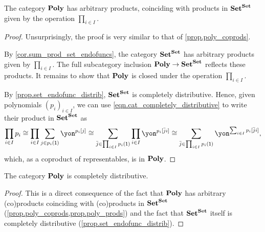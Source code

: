 \documentclass[Book-Poly]{subfiles}
\begin{document}
\begin{proposition}\label{prop.poly_prods}
  The category $\mathbf{Poly}$ has arbitrary products, coinciding with products in $\mathbf{Set}^{\mathbf{Set}}$ given by the operation $\prod_{i \in I}$.
\end{proposition}
\begin{proof}
  Unsurprisingly, the proof is very similar to that of \cref{prop.poly_coprods}.

  By \cref{cor.sum_prod_set_endofuncs}, the category $\mathbf{Set}^{\mathbf{Set}}$ has arbitrary products given by $\prod_{i \in I}$.
  The full subcategory inclusion $\mathbf{Poly} \to \mathbf{Set}^{\mathbf{Set}}$ reflects these products.
  It remains to show that $\mathbf{Poly}$ is closed under the operation $\prod_{i \in I}$.

  By \cref{prop.set_endofunc_distrib}, $\mathbf{Set}^{\mathbf{Set}}$ is completely distributive.
  Hence, given polynomials $(p_i)_{i \in I}$, we can use \eqref{eqn.cat_completely_distributive} to write their product in $\mathbf{Set}^{\mathbf{Set}}$ as
  \begin{equation} \label{eqn.poly_prod}
    \prod_{i \in I} p_i \iso \prod_{i \in I} \sum_{j \in p_i(\1)} \yon^{p_i[j]} \iso \sum_{\bar{j} \in \prod_{i \in I} p_i(\1)} \prod_{i \in I} \yon^{p_i[\bar{j}i]} \iso \sum_{\bar{j} \in \prod_{i \in I} p_i(\1)} \yon^{\sum_{i \in I} p_i[\bar{j}i]},
  \end{equation}
  which, as a coproduct of representables, is in $\mathbf{Poly}$.
\end{proof}


\begin{corollary} \label{prop.poly_completely_distributive}
  The category $\mathbf{Poly}$ is completely distributive.
\end{corollary}
\begin{proof}
  This is a direct consequence of the fact that $\mathbf{Poly}$ has arbitrary (co)products coinciding with (co)products in $\mathbf{Set}^{\mathbf{Set}}$ (\cref{prop.poly_coprods,prop.poly_prods}) and the fact that $\mathbf{Set}^{\mathbf{Set}}$ itself is completely distributive (\cref{prop.set_endofunc_distrib}).
\end{proof}
\end{document}

